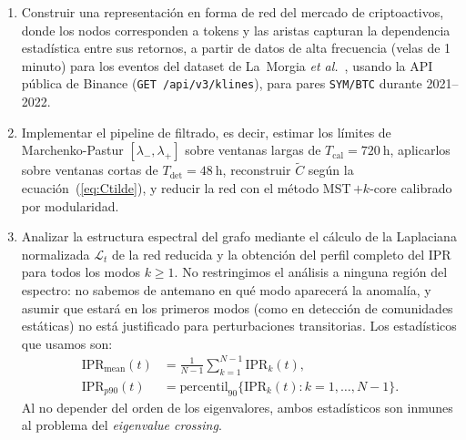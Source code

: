 \begin{enumerate}

    \item Construir una representación en forma de red del mercado de criptoactivos, donde los nodos corresponden a tokens y las aristas capturan la dependencia estadística entre sus retornos, a partir de datos de alta frecuencia (velas de 1 minuto) para los eventos del dataset de La~Morgia \textit{et al.}~\cite{lamorgia2020}, usando la API pública de Binance (\texttt{GET /api/v3/klines}), para pares \texttt{SYM/BTC} durante 2021--2022.

    \item Implementar el pipeline de filtrado, es decir, estimar los límites de Marchenko-Pastur $[\lambda_-, \lambda_+]$ sobre ventanas largas de $T_{\text{cal}} = 720~\text{h}$, aplicarlos sobre ventanas cortas de $T_{\text{det}} = 48~\text{h}$, reconstruir $\tilde{C}$ según la ecuación~(\ref{eq:Ctilde}), y reducir la red con el método MST\,$+k$-core calibrado por modularidad.

    \item Analizar la estructura espectral del grafo mediante el cálculo de la Laplaciana normalizada $\mathcal{L}_t$ de la red reducida y la obtención del perfil completo del IPR para todos los modos $k \geq 1$.
        No restringimos el análisis a ninguna región del espectro:
        no sabemos de antemano en qué modo aparecerá la anomalía, y asumir
        que estará en los primeros modos (como en detección de comunidades
        estáticas) no está justificado para perturbaciones transitorias. Los
        estadísticos que usamos son:
        \begin{align*}
          \mathrm{IPR}_{\text{mean}}(t) &= \frac{1}{N-1}
            \sum_{k=1}^{N-1} \mathrm{IPR}_k(t), \\[3pt]
          \mathrm{IPR}_{p90}(t) &= \mathrm{percentil}_{90}
            \bigl\{\mathrm{IPR}_k(t) : k = 1, \ldots, N-1\bigr\}.
        \end{align*}
        Al no depender del orden de los eigenvalores, ambos estadísticos son
        inmunes al problema del \emph{eigenvalue crossing}.


\end{enumerate}
